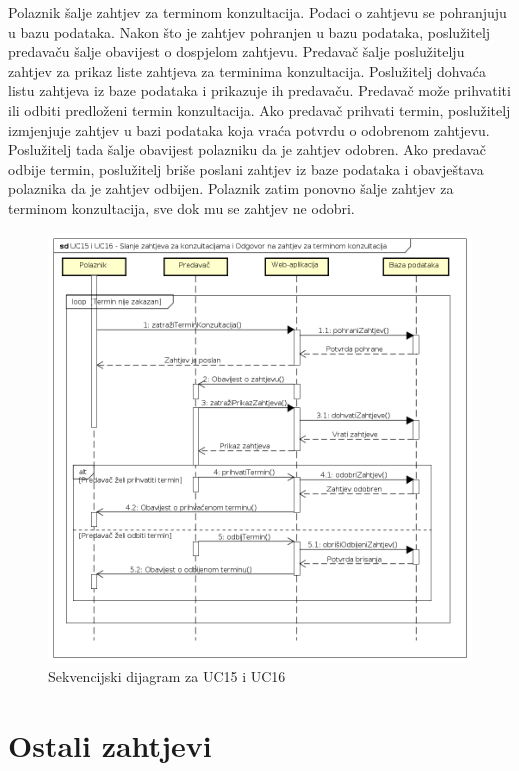 					Polaznik šalje zahtjev za terminom konzultacija. Podaci o zahtjevu se pohranjuju u bazu podataka. \newline
					Nakon što je zahtjev pohranjen u bazu podataka, 	poslužitelj predavaču šalje obavijest o dospjelom zahtjevu. Predavač šalje poslužitelju zahtjev za prikaz liste zahtjeva za terminima konzultacija. Poslužitelj dohvaća listu zahtjeva iz baze podataka i prikazuje ih predavaču. Predavač može prihvatiti ili odbiti predloženi termin konzultacija. Ako predavač prihvati termin, poslužitelj izmjenjuje zahtjev u bazi podataka koja vraća potvrdu o odobrenom zahtjevu. Poslužitelj tada šalje obavijest polazniku da je zahtjev odobren. Ako predavač odbije termin, poslužitelj briše poslani zahtjev iz baze podataka i obavještava polaznika da je zahtjev odbijen. Polaznik zatim ponovno šalje zahtjev za terminom konzultacija, sve dok mu se zahtjev ne odobri.
				\eject
				
					\begin{figure}[h]
						\includegraphics[scale=0.59]{dijagrami/UML_sd_UC15UC16.PNG}
						\centering
						\caption{Sekvencijski dijagram za UC15 i UC16}
						\label{fig:UML_sd_UC15UC16}
					\end{figure}
				\eject
				
		\section{Ostali zahtjevi}
		

